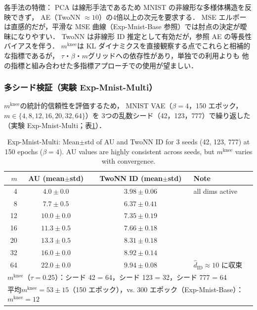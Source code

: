 \documentclass[11pt,a4paper]{jsarticle}
\newcommand{\mknee}{m^{\mathrm{knee}}}
\begin{document}
各手法の特徴：
PCA は線形手法であるため MNIST の非線形な多様体構造を反映できず，
AE（TwoNN $\approx 10$）の4倍以上の次元を要求する．
MSE エルボーは直感的だが，平滑な MSE 曲線（Exp-Mnist-Base 参照）では肘点の決定が曖昧になりやすい．
TwoNN は非線形 ID 推定として有効だが，参照 AE の等長性バイアスを伴う．
$\mknee$は KL ダイナミクスを直接観察する点でこれらと相補的な指標であるが，
$\tau$・$\beta$・$m$グリッドへの依存性があり，単独での利用よりも
他の指標と組み合わせた多指標アプローチでの使用が望ましい．

\subsubsection{多シード検証（実験 Exp-Mnist-Multi）}\label{sec:exp_multiseed}

$\mknee$の統計的信頼性を評価するため，
MNIST VAE（$\beta = 4$，150 エポック，$m \in \{4,8,12,16,20,32,64\}$）を
3つの乱数シード（42，123，777）で繰り返した（実験 Exp-Mnist-Multi；表\ref{tab:e4_multiseed}）．

\begin{table}[H]
\centering
\caption{Exp-Mnist-Multi: Mean$\pm$std of AU and TwoNN ID for 3 seeds (42, 123, 777) at 150 epochs ($\beta=4$). AU values are highly consistent across seeds, but $\mknee$ varies with convergence.}
\label{tab:e4_multiseed}
\small
\begin{tabular}{rccl}
\toprule
$m$ & AU (mean$\pm$std) & TwoNN ID (mean$\pm$std) & Note \\
\midrule
 4 & $4.0 \pm 0.0$ & $3.98 \pm 0.06$ & all dims active \\
 8 & $7.7 \pm 0.5$ & $6.37 \pm 0.41$ & \\
12 & $10.0 \pm 0.0$ & $7.35 \pm 0.19$ & \\
16 & $11.3 \pm 0.5$ & $7.66 \pm 0.18$ & \\
20 & $13.3 \pm 0.5$ & $8.31 \pm 0.18$ & \\
32 & $16.0 \pm 0.0$ & $8.92 \pm 0.14$ & \\
64 & $22.0 \pm 0.0$ & $9.94 \pm 0.08$ & $\hat{d}_\mathrm{ID} \approx 10$ に収束 \\
\midrule
\multicolumn{4}{l}{$\mknee$（$\tau=0.25$）：シード 42 = 64，シード 123 = 32，シード 777 = 64} \\
\multicolumn{4}{l}{平均$\mknee = 53 \pm 15$（150 エポック），vs. 300 エポック（Exp-Mnist-Base）：$\mknee = 12$} \\
\bottomrule
\end{tabular}
\end{table}
\end{document}
